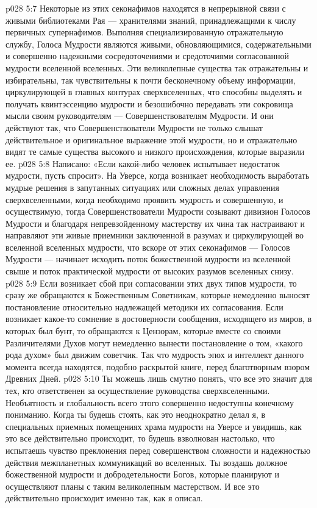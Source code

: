 \vs p028 5:7 \pc {}\bibnobreakspace {} Некоторые из этих секонафимов находятся в непрерывной связи с живыми библиотеками Рая --- хранителями знаний, принадлежащими к числу первичных супернафимов. Выполняя специализированную отражательную службу, Голоса Мудрости являются живыми, обновляющимися, содержательными и совершенно надежными сосредоточениями и средоточиями согласованной мудрости вселенной вселенных. Эти великолепные существа так отражательны и избирательны, так чувствительны к почти бесконечному объему информации, циркулирующей в главных контурах сверхвселенных, что способны выделять и получать квинтэссенцию мудрости и безошибочно передавать эти сокровища мысли своим руководителям --- Совершенствователям Мудрости. И они действуют так, что Совершенствователи Мудрости не только слышат действительное и оригинальное выражение этой мудрости, но и отражательно видят те самые существа высокого и низкого происхождения, которые выразили ее.
\vs p028 5:8 Написано: «Если какой\hyp{}либо человек испытывает недостаток мудрости, пусть спросит». На Уверсе, когда возникает необходимость выработать мудрые решения в запутанных ситуациях или сложных делах управления сверхвселенными, когда необходимо проявить мудрость и совершенную, и осуществимую, тогда Совершенствователи Мудрости созывают дивизион Голосов Мудрости и благодаря непревзойденному мастерству их чина так настраивают и направляют эти живые приемники заключенной в разумах и циркулирующей во вселенной вселенных мудрости, что вскоре от этих секонафимов --- Голосов Мудрости --- начинает исходить поток божественной мудрости из вселенной свыше и поток практической мудрости от высоких разумов вселенных снизу.
\vs p028 5:9 Если возникает сбой при согласовании этих двух типов мудрости, то сразу же обращаются к Божественным Советникам, которые немедленно выносят постановление относительно надлежащей методики их согласования. Если возникает какое\hyp{}то сомнение в достоверности сообщения, исходящего из миров, в которых был бунт, то обращаются к Цензорам, которые вместе со своими Различителями Духов могут немедленно вынести постановление о том, «какого рода духом» был движим советчик. Так что мудрость эпох и интеллект данного момента всегда находятся, подобно раскрытой книге, перед благотворным взором Древних Дней.
\vs p028 5:10 Ты можешь лишь смутно понять, что все это значит для тех, кто ответственен за осуществление руководства сверхвселенными. Необъятность и глобальность всего этого совершенно недоступны конечному пониманию. Когда ты будешь стоять, как это неоднократно делал я, в специальных приемных помещениях храма мудрости на Уверсе и увидишь, как это все действительно происходит, то будешь взволнован настолько, что испытаешь чувство преклонения перед совершенством сложности и надежностью действия межпланетных коммуникаций во вселенных. Ты воздашь должное божественной мудрости и добродетельности Богов, которые планируют и осуществляют планы с таким великолепным мастерством. И все это действительно происходит именно так, как я описал.
